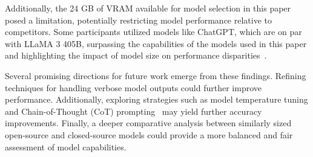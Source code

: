 Additionally, the 24 GB of VRAM available for model selection in this paper posed a limitation, potentially restricting model performance relative to competitors. Some participants utilized models like ChatGPT, which are on par with LLaMA 3 405B, surpassing the capabilities of the models used in this paper and highlighting the impact of model size on performance disparities~\cite{grattafioriLlama3Herd2024,openaiGPT4TechnicalReport2024}.

Several promising directions for future work emerge from these findings. Refining techniques for handling verbose model outputs could further improve performance. Additionally, exploring strategies such as model temperature tuning and Chain-of-Thought (CoT) prompting~\cite{weiChainofThoughtPromptingElicits2023} may yield further accuracy improvements. Finally, a deeper comparative analysis between similarly sized open-source and closed-source models could provide a more balanced and fair assessment of model capabilities.
